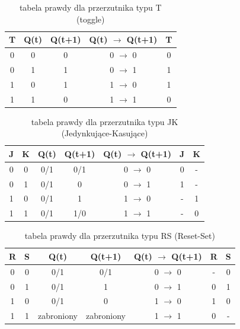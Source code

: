 \begin{table}[h!]
    \centering
    \begin{tabular}{c|c|c||c|c}
        T & Q(t) & Q(t+1) & Q(t) $\rightarrow$ Q(t+1) & T \\
        \hline
        0 & 0 & 0 & 0 $\rightarrow$ 0 & 0 \\
        0 & 1 & 1 & 0 $\rightarrow$ 1 & 1 \\
        1 & 0 & 1 & 1 $\rightarrow$ 0 & 1 \\
        1 & 1 & 0 & 1 $\rightarrow$ 1 & 0 \\
    \end{tabular}
    \caption{tabela prawdy dla przerzutnika typu T (toggle)}
    \label{tab:my_label}
\end{table}

\begin{table}[h!]
    \centering
    \begin{tabular}{c|c|c|c||c|c|c}
        J & K & Q(t) & Q(t+1) & Q(t) $\rightarrow$ Q(t+1) & J & K \\
        \hline
        0 & 0 & 0/1 & 0/1 & 0 $\rightarrow$ 0 & 0 & - \\
        0 & 1 & 0/1 & 0   & 0 $\rightarrow$ 1 & 1 & - \\
        1 & 0 & 0/1 & 1   & 1 $\rightarrow$ 0 & - & 1 \\
        1 & 1 & 0/1 & 1/0 & 1 $\rightarrow$ 1 & - & 0 \\
    \end{tabular}
    \caption{tabela prawdy dla przerzutnika typu JK (Jedynkujące-Kasujące)}
    \label{tab:my_label}
\end{table}

\begin{table}[h!]
    \centering
    \begin{tabular}{c|c|c|c||c|c|c}
        R & S & Q(t) & Q(t+1) & Q(t) $\rightarrow$ Q(t+1) & R & S \\
        \hline
        0 & 0 & 0/1 & 0/1 & 0 $\rightarrow$ 0 & - & 0 \\
        0 & 1 & 0/1 & 1   & 0 $\rightarrow$ 1 & 0 & 1 \\
        1 & 0 & 0/1 & 0   & 1 $\rightarrow$ 0 & 1 & 0 \\
        1 & 1 & zabroniony & zabroniony & 1 $\rightarrow$ 1 & 0 & - \\
    \end{tabular}
    \caption{tabela prawdy dla przerzutnika typu RS (Reset-Set)}
    \label{tab:my_label}
\end{table}

